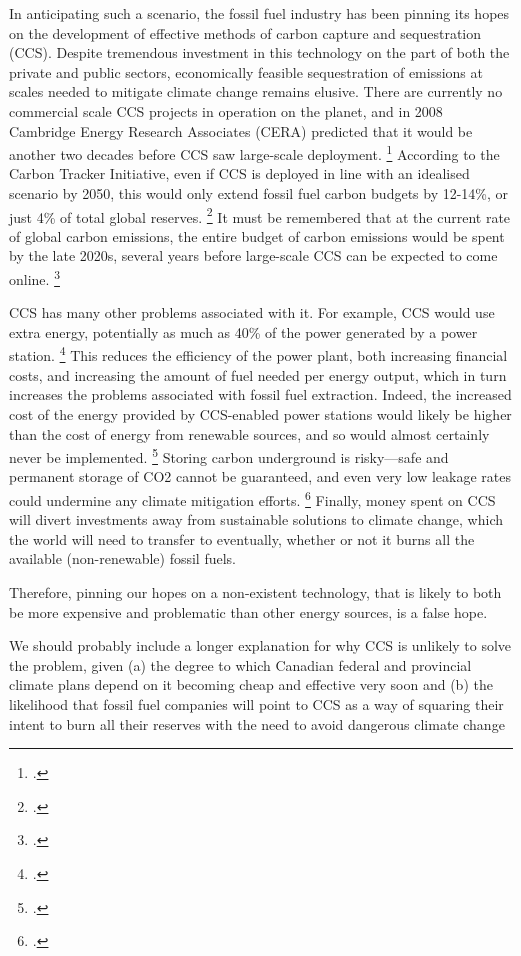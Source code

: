 In anticipating such a scenario, the fossil fuel industry has been pinning its hopes on the development of effective methods of carbon capture and sequestration (CCS). 
Despite tremendous investment in this technology on the part of both the private and public sectors, economically feasible sequestration of emissions at scales needed to mitigate climate change remains elusive. 
There are currently no commercial scale CCS projects in operation on the planet, and in 2008 Cambridge Energy Research Associates (CERA) predicted that it would be another two decades before CCS saw large-scale deployment. \footcite{CERACrossing}
According to the Carbon Tracker Initiative, even if CCS is deployed in line with an idealised scenario by 2050, this would only extend fossil fuel carbon budgets by 12-14\%, or just 4\% of total global reserves. \footcite{CTI2013}
It must be remembered that at the current rate of global carbon emissions, the entire budget of carbon emissions would be spent by the late 2020s, several years before large-scale CCS can be expected to come online. \footcite{CTI2012}

CCS has many other problems associated with it. For example, CCS would use extra energy, potentially as much as 40\% of the power generated by a power station. \footcite{GPCCS}
This reduces the efficiency of the power plant, both increasing financial costs, and increasing the amount of fuel needed per energy output, which in turn increases the problems associated with fossil fuel extraction.
Indeed, the increased cost of the energy provided by CCS-enabled power stations would likely be higher than the cost of energy from renewable sources, and so would almost certainly never be implemented. \footcite{SmartPlanetCCS}
Storing carbon underground is risky—safe and permanent storage of CO2 cannot be guaranteed, and even very low leakage rates could undermine any climate mitigation efforts. \footcite{GPCCS}
Finally, money spent on CCS will divert investments away from sustainable solutions to climate change, which the world will need to transfer to eventually, whether or not it burns all the available (non-renewable) fossil fuels.

Therefore, pinning our hopes on a non-existent technology, that is likely to both be more expensive and problematic than other energy sources, is a false hope.

\begin{vcom}
  We should probably include a longer explanation for why CCS is unlikely to solve the problem, given (a) the degree to which Canadian federal and provincial climate plans depend on it becoming cheap and effective very soon and (b) the likelihood that fossil fuel companies will point to CCS as a way of squaring their intent to burn all their reserves with the need to avoid dangerous climate change
\end{vcom}



